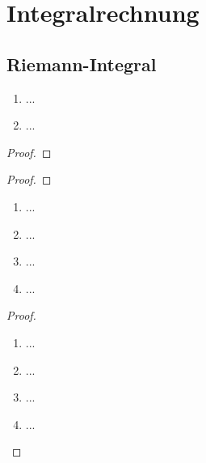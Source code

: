 \documentclass[12pt]{scrreprt}
\begin{document}
\chapter{Integralrechnung}
\label{cha:int}

\section{Riemann-Integral}
\label{}

\begin{dfn}\label{}

\end{dfn}

\begin{lem}\label{}
\begin{enumerate}
\item ...
\item ...
\end{enumerate}
\end{lem}
\begin{proof}

\end{proof}

\begin{bsp}\label{}

\end{bsp}

\begin{bem}\label{}

\end{bem}

\begin{satz}\label{}

\end{satz}
\begin{proof}

\end{proof}

\begin{dfn*}

\end{dfn*}

\begin{satz}\label{}
\begin{enumerate}
\item ...
\item ...
\item ...
\item ...
\end{enumerate}
\end{satz}
\begin{proof}
\begin{enumerate}
\item ...
\item ...
\item ...
\item ...
\end{enumerate}
\end{proof}
\end{document}
